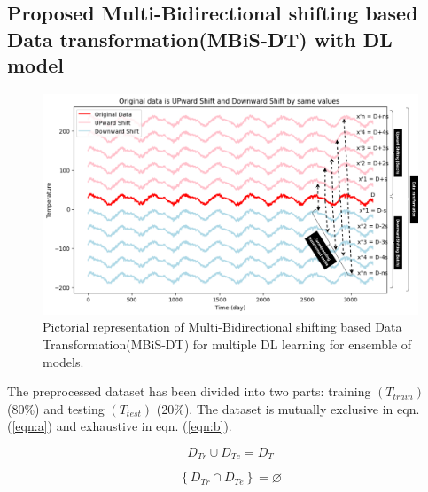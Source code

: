\documentclass[sn-mathphys,Numbered]{sn-jnl}
\theoremstyle{thmstyleone}
\theoremstyle{thmstyletwo}
\theoremstyle{thmstylethree}
\begin{document}
\subsection{Proposed Multi-Bidirectional shifting based Data transformation(MBiS-DT) with DL model}
\begin{figure}[ht!]
\centering
\includegraphics[scale = 0.4]{shifted_dataset.png}
\caption{Pictorial representation of Multi-Bidirectional shifting based Data Transformation(MBiS-DT) for multiple DL learning for ensemble of models.}
\label{fig:shifted_dataset}
\end{figure}
The preprocessed dataset has been divided into two parts: training \((T_{train})\) (80\%) and testing \((T_{test})\) (20\%). The dataset is mutually exclusive in eqn. (\ref{eqn:a}) and exhaustive in eqn. (\ref{eqn:b}).

\begin{equation}
\label{eqn:a}
D_{Tr}\cup D_{Te}=D_{T}
\end{equation}

\begin{equation}
\label{eqn:b}
\left \{ D_{Tr} \cap D_{Te} \right \}=\varnothing
\end{equation}
\end{document}

